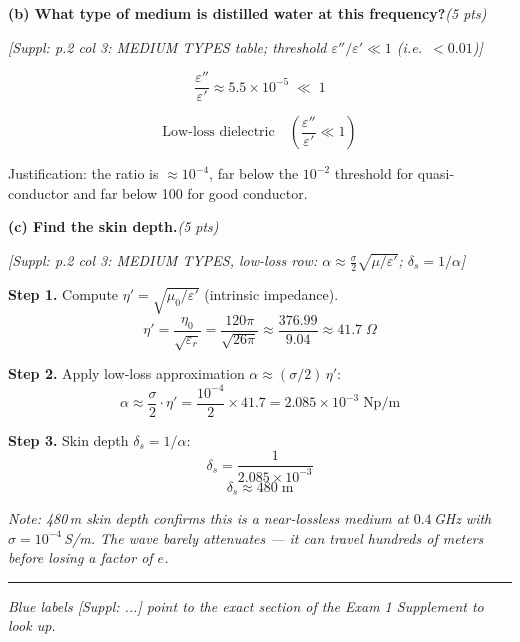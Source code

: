 \documentclass[11pt,letterpaper]{article}
\newcommand{\refbox}[1]{\textcolor{ref}{\textit{[Suppl: #1]}}}
\newcommand{\ptag}[1]{\hfill\textit{(#1 pts)}}
\newcommand{\step}[1]{\medskip\noindent\textbf{Step #1.}\enspace}
\newcommand{\note}[1]{\par\noindent\textcolor{note}{\textit{Note: #1}}}
\begin{document}
\medskip

\textbf{(b) What type of medium is distilled water at this frequency?}\ptag{5}

\refbox{p.2 col 3: MEDIUM TYPES table; threshold $\varepsilon''/\varepsilon'\ll 1$ (i.e.\ $<0.01$)}

\[
\frac{\varepsilon''}{\varepsilon'} \approx 5.5\times10^{-5} \;\ll\; 1
\]

\[
\boxed{\text{Low-loss dielectric}\quad\left(\frac{\varepsilon''}{\varepsilon'}\ll1\right)}
\]

Justification: the ratio is $\approx10^{-4}$, far below the $10^{-2}$ threshold for quasi-conductor
and far below 100 for good conductor.

\medskip

\textbf{(c) Find the skin depth.}\ptag{5}

\refbox{p.2 col 3: MEDIUM TYPES, low-loss row: $\alpha\approx\tfrac{\sigma}{2}\sqrt{\mu/\varepsilon'}$;
$\delta_s=1/\alpha$}

\step{1} Compute $\eta'=\sqrt{\mu_0/\varepsilon'}$ (intrinsic impedance).
\[
\eta' = \frac{\eta_0}{\sqrt{\varepsilon_r}}
= \frac{120\pi}{\sqrt{26\pi}}
\approx \frac{376.99}{9.04}
\approx 41.7\;\Omega
\]

\step{2} Apply low-loss approximation $\alpha\approx(\sigma/2)\,\eta'$:
\[
\alpha \approx \frac{\sigma}{2}\cdot\eta'
= \frac{10^{-4}}{2}\times41.7
= 2.085\times10^{-3}\;\text{Np/m}
\]

\step{3} Skin depth $\delta_s=1/\alpha$:
\[
\delta_s = \frac{1}{2.085\times10^{-3}}
\]
\[
\boxed{\delta_s \approx 480\;\text{m}}
\]

\note{480\,m skin depth confirms this is a near-lossless medium at $0.4$\,GHz with $\sigma=10^{-4}$\,S/m.
The wave barely attenuates --- it can travel hundreds of meters before losing a factor of $e$.}

\bigskip
\noindent\rule{\linewidth}{0.6pt}
\begin{center}
\textit{Blue labels \refbox{...} point to the exact section of the Exam 1 Supplement to look up.}
\end{center}
\end{document}
